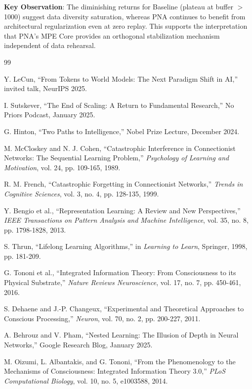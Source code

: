 \documentclass[11pt]{article}
\begin{document}
\textbf{Key Observation}: The diminishing returns for Baseline (plateau at buffer $>$ 1000) suggest data diversity saturation, whereas PNA continues to benefit from architectural regularization even at zero replay. This supports the interpretation that PNA's MPE Core provides an orthogonal stabilization mechanism independent of data rehearsal.

\begin{thebibliography}{99}

Y. LeCun, ``From Tokens to World Models: The Next Paradigm Shift in AI,'' invited talk, NeurIPS 2025.

I. Sutskever, ``The End of Scaling: A Return to Fundamental Research,'' No Priors Podcast, January 2025.

G. Hinton, ``Two Paths to Intelligence,'' Nobel Prize Lecture, December 2024.

M. McCloskey and N. J. Cohen, ``Catastrophic Interference in Connectionist Networks: The Sequential Learning Problem,'' \textit{Psychology of Learning and Motivation}, vol. 24, pp. 109-165, 1989.

R. M. French, ``Catastrophic Forgetting in Connectionist Networks,'' \textit{Trends in Cognitive Sciences}, vol. 3, no. 4, pp. 128-135, 1999.

Y. Bengio et al., ``Representation Learning: A Review and New Perspectives,'' \textit{IEEE Transactions on Pattern Analysis and Machine Intelligence}, vol. 35, no. 8, pp. 1798-1828, 2013.

S. Thrun, ``Lifelong Learning Algorithms,'' in \textit{Learning to Learn}, Springer, 1998, pp. 181-209.

G. Tononi et al., ``Integrated Information Theory: From Consciousness to its Physical Substrate,'' \textit{Nature Reviews Neuroscience}, vol. 17, no. 7, pp. 450-461, 2016.

S. Dehaene and J.-P. Changeux, ``Experimental and Theoretical Approaches to Conscious Processing,'' \textit{Neuron}, vol. 70, no. 2, pp. 200-227, 2011.

A. Behrouz and V. Pham, ``Nested Learning: The Illusion of Depth in Neural Networks,'' Google Research Blog, January 2025.

M. Oizumi, L. Albantakis, and G. Tononi, ``From the Phenomenology to the Mechanisms of Consciousness: Integrated Information Theory 3.0,'' \textit{PLoS Computational Biology}, vol. 10, no. 5, e1003588, 2014.


\end{thebibliography}
\end{document}
